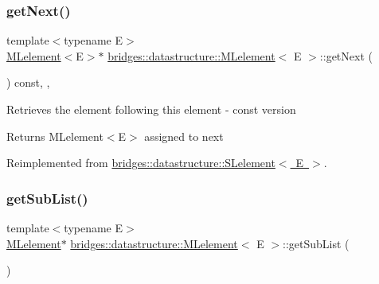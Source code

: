 \subsubsection{\texorpdfstring{get\+Next()}{getNext()}\hspace{0.1cm}{\footnotesize\ttfamily [2/2]}}
{\footnotesize\ttfamily template$<$typename E$>$ \\
\mbox{\hyperlink{classbridges_1_1datastructure_1_1_m_lelement}{M\+Lelement}}$<$E$>$$\ast$ \mbox{\hyperlink{classbridges_1_1datastructure_1_1_m_lelement}{bridges\+::datastructure\+::\+M\+Lelement}}$<$ E $>$\+::get\+Next (\begin{DoxyParamCaption}{ }\end{DoxyParamCaption}) const\hspace{0.3cm}{\ttfamily [inline]}, {\ttfamily [override]}, {\ttfamily [virtual]}}

Retrieves the element following this element -\/ const version

\begin{DoxyReturn}{Returns}
M\+Lelement$<$\+E$>$ assigned to next 
\end{DoxyReturn}


Reimplemented from \mbox{\hyperlink{classbridges_1_1datastructure_1_1_s_lelement_a8c62cb82fa64bbfe9ebb7334a5fea417}{bridges\+::datastructure\+::\+S\+Lelement$<$ E $>$}}.

\mbox{\label{classbridges_1_1datastructure_1_1_m_lelement_a9faeb30ffd023746ce36e05705a62b2d}} 
\subsubsection{\texorpdfstring{get\+Sub\+List()}{getSubList()}}
{\footnotesize\ttfamily template$<$typename E$>$ \\
\mbox{\hyperlink{classbridges_1_1datastructure_1_1_m_lelement}{M\+Lelement}}$\ast$ \mbox{\hyperlink{classbridges_1_1datastructure_1_1_m_lelement}{bridges\+::datastructure\+::\+M\+Lelement}}$<$ E $>$\+::get\+Sub\+List (\begin{DoxyParamCaption}{ }\end{DoxyParamCaption})\hspace{0.3cm}{\ttfamily [inline]}}

